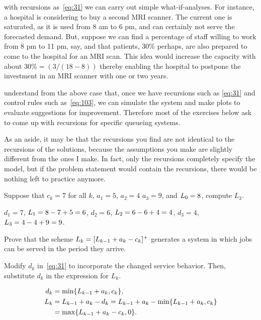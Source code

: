  with recursions as~\cref{eq:31} we can carry out simple what-if-analyses.
For instance, a hospital is considering to buy a second MRI scanner.
The current one is saturated, as it is used from 8 am to 6 pm, and can certainly not serve the forecasted demand.
But, suppose we can find a percentage of staff willing to work from 8 pm to 11 pm, say, and that patients, 30\% perhaps, are also prepared to come to the hospital for an MRI scan.
This idea would increase the capacity with about $30\% = (3/(18-8))$ thereby enabling the hospital to postpone the investment in an MRI scanner with one or two years.



 understand from the above case that, once we have recursions such as \cref{eq:31} and control rules such as~\cref{eq:103}, we can simulate the system and make plots to evaluate suggestions for improvement. Therefore most  of the exercises below ask to come up with recursions for specific queueing systems.

As an aside, it may be that the recursions you find are not identical to the recursions of the solutions, because the assumptions you make are slightly different from the ones I make.
In fact, only the recursions completely specify the model, but if the problem statement would contain the recursions, there would be nothing left to practice anymore. 


\begin{exercise}\label{ex:58}
 Suppose that $c_k= 7$ for all $k$, $a_1=5$, $a_2=4$ $a_3=9$, and $L_0=8$, compute $L_3$. 
\begin{solution}
$d_1=7$, $L_1=8-7+5=6$, $d_2 = 6$, $L_2=6-6+4=4$, $d_3 = 4$, $L_3=4-4+9=9$.
\end{solution}
\end{exercise}



\begin{exercise}\label{ex:24} 
Prove  that the scheme
$L_k = [L_{k-1}+a_k - c_k]^+$ 
generates a system in which jobs can be served in the period they arrive.
\begin{hint}
  Modify $d_k$ in~\cref{eq:31} to incorporate the changed service behavior.
  Then, substitute $d_k$ in the expression for $L_k$.
\end{hint}
\begin{solution}
 \begin{align*}
 d_k &= \min\{L_{k-1}+a_k, c_k\}, \\
 L_k &= L_{k-1} + a_k - d_k  = L_{k-1} + a_k - \min\{L_{k-1}+a_k, c_k\} \\
 &= \max\{L_{k-1} + a_k - c_k, 0 \}.
 \end{align*}
\end{solution}
\end{exercise}



